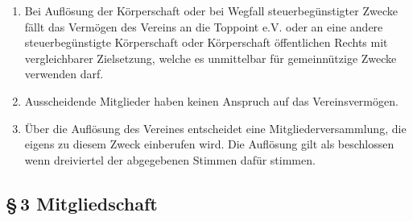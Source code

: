 \documentclass[12pt,a4paper]{article}
\begin{document}
\begin{enumerate}
\item Bei Auflösung der Körperschaft oder bei Wegfall steuerbegünstigter Zwecke fällt das Vermögen des Vereins an die Toppoint e.V. oder an eine andere steuerbegünstigte Körperschaft oder Körperschaft öffentlichen Rechts mit vergleichbarer Zielsetzung, welche es unmittelbar für gemeinnützige Zwecke verwenden darf. 
\item Ausscheidende Mitglieder haben keinen Anspruch auf das Vereinsvermögen. 
\item Über die Auflösung des Vereines entscheidet eine Mitgliederversammlung, die eigens zu diesem Zweck einberufen wird. Die Auflösung gilt als beschlossen wenn dreiviertel der abgegebenen Stimmen dafür stimmen. 
\end{enumerate}

\subsection*{§\,3 Mitgliedschaft}
\end{document}

